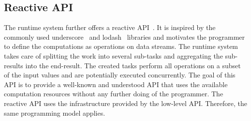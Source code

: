 \subsection{Reactive API}
The runtime system further offers a reactive API~\cite{Meijer2012}. It is inspired by the commonly used underscore~\cite{underscorejs} and lodash~\cite{lodash} libraries and motivates the programmer to define the computations as operations on data streams. The runtime system takes care of splitting the work into several sub-tasks and aggregating the sub-results into the end-result. The created tasks perform all operations on a subset of the input values and are potentially executed concurrently. The goal of this API is to provide a well-known and understood API that uses the available computation resources without any further doing of the programmer. The reactive API uses the infrastructure provided by the low-level API. Therefore, the same programming model applies.


